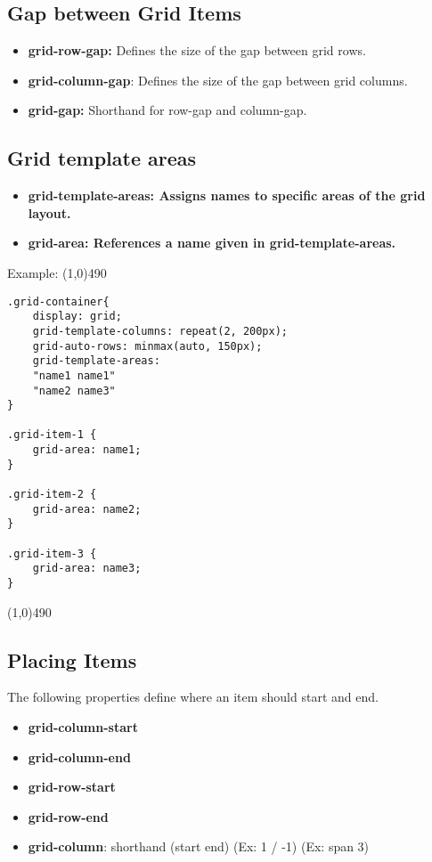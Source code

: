 \documentclass{report}
\begin{document}
    \bigbreak \noindent 
    \subsection{Gap between Grid Items}
    \begin{itemize}
        \item \textbf{grid-row-gap:} Defines the size of the gap between grid rows.
        \item \textbf{grid-column-gap}: Defines the size of the gap between grid columns.
        \item \textbf{grid-gap:} Shorthand for row-gap and column-gap.
    \end{itemize}

    \pagebreak \bigbreak \noindent 
    \subsection{Grid template areas}
    \bigbreak \noindent 
    \begin{itemize}
        \item \textbf{grid-template-areas: Assigns names to specific areas of the grid layout.}
        \item \textbf{grid-area: References a name given in grid-template-areas.}
    \end{itemize}
    \bigbreak \noindent 
    Example:
    \bigbreak \noindent 
    \line(1,0){490}
    \begin{verbatim}
.grid-container{
    display: grid;
    grid-template-columns: repeat(2, 200px);
    grid-auto-rows: minmax(auto, 150px);
    grid-template-areas: 
    "name1 name1"
    "name2 name3"
}

.grid-item-1 {
    grid-area: name1;
}

.grid-item-2 {
    grid-area: name2;
}

.grid-item-3 {
    grid-area: name3;
}
    \end{verbatim}
    \line(1,0){490}



    \bigbreak \noindent 
    \subsection{Placing Items}
    The following properties define where an item should start and end.
    \begin{itemize}
        \item \textbf{grid-column-start}
        \item \textbf{grid-column-end}
        \item \textbf{grid-row-start}
        \item \textbf{grid-row-end}
        \item \textbf{grid-column}: shorthand (start end) (Ex: 1 / -1) (Ex: span 3)
    \end{itemize}
    \bigbreak \noindent 
\end{document}
